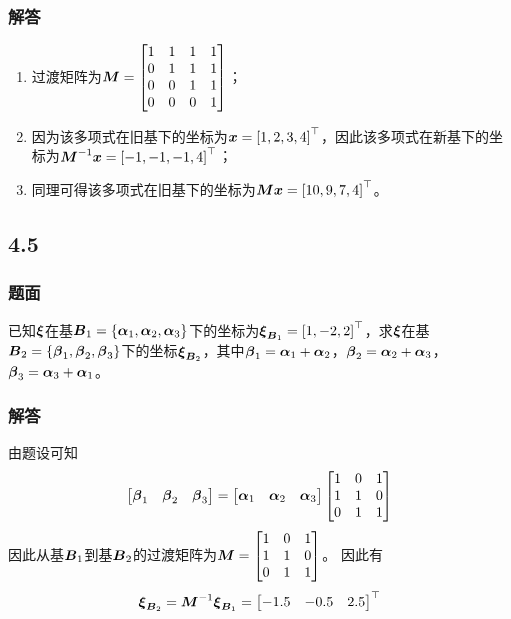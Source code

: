 \documentclass{beamer}
\begin{document}
\begin{frame}
    \frametitle{解答}
    \begin{enumerate}
        \item 过渡矩阵为\(\boldsymbol{M}=\begin{bmatrix}1&1&1&1\\0&1&1&1\\0&0&1&1\\0&0&0&1\end{bmatrix}\)；\pause
        \item 因为该多项式在旧基下的坐标为\(\boldsymbol{x}=\left[ 1,2,3,4 \right]^\top\)，因此该多项式在新基下的坐标为\({\boldsymbol{M}}^{-1}\boldsymbol{x}=\left[ -1,-1,-1,4 \right]^\top\)；\pause
        \item 同理可得该多项式在旧基下的坐标为\(\boldsymbol{M}\boldsymbol{x}=\left[ 10,9,7,4 \right]^\top\)。
    \end{enumerate}
\end{frame}

\subsection*{4.5}
\begin{frame}
    \frametitle{题面}
    已知\(\boldsymbol{\xi}\)在基\(\boldsymbol{B}_1=\left\{\boldsymbol{\alpha}_1,\boldsymbol{\alpha}_2,\boldsymbol{\alpha}_3 \right\}\)下的坐标为\(\boldsymbol{\xi}_{\boldsymbol{B}_1}=\left[ 1,-2,2 \right]^\top\)，求\(\boldsymbol{\xi}\)在基\(\boldsymbol{B}_2=\left\{\boldsymbol{\beta}_1,\boldsymbol{\beta}_2,\boldsymbol{\beta}_3 \right\}\)下的坐标\(\boldsymbol{\xi}_{\boldsymbol{B}_2}\)，其中\(\boldsymbol{\beta}_1=\boldsymbol{\alpha}_1+\boldsymbol{\alpha}_2\)，\(\boldsymbol{\beta}_2=\boldsymbol{\alpha}_2+\boldsymbol{\alpha}_3\)，\(\boldsymbol{\beta}_3=\boldsymbol{\alpha}_3+\boldsymbol{\alpha}_1\)。
\end{frame}

\begin{frame}
    \frametitle{解答}
    由题设可知
    \begin{equation*}
        \begin{bmatrix}\boldsymbol{\beta}_1&\boldsymbol{\beta}_2&\boldsymbol{\beta}_3\end{bmatrix}=
        \begin{bmatrix}\boldsymbol{\alpha}_1&\boldsymbol{\alpha}_2&\boldsymbol{\alpha}_3\end{bmatrix}
        \begin{bmatrix}
            1 & 0 & 1 \\
            1 & 1 & 0 \\
            0 & 1 & 1
        \end{bmatrix}
    \end{equation*}
    因此从基\(\boldsymbol{B}_1\)到基\(\boldsymbol{B}_2\)的过渡矩阵为\(\boldsymbol{M}=\begin{bmatrix}1&0&1\\1&1&0\\0&1&1\end{bmatrix}\)。
    因此有
    \begin{equation*}
        \boldsymbol{\xi}_{\boldsymbol{B}_2}={\boldsymbol{M}}^{-1}\boldsymbol{\xi}_{\boldsymbol{B}_1}=\begin{bmatrix}-1.5&-0.5&2.5\end{bmatrix}^\top
    \end{equation*}
\end{frame}
\end{document}
